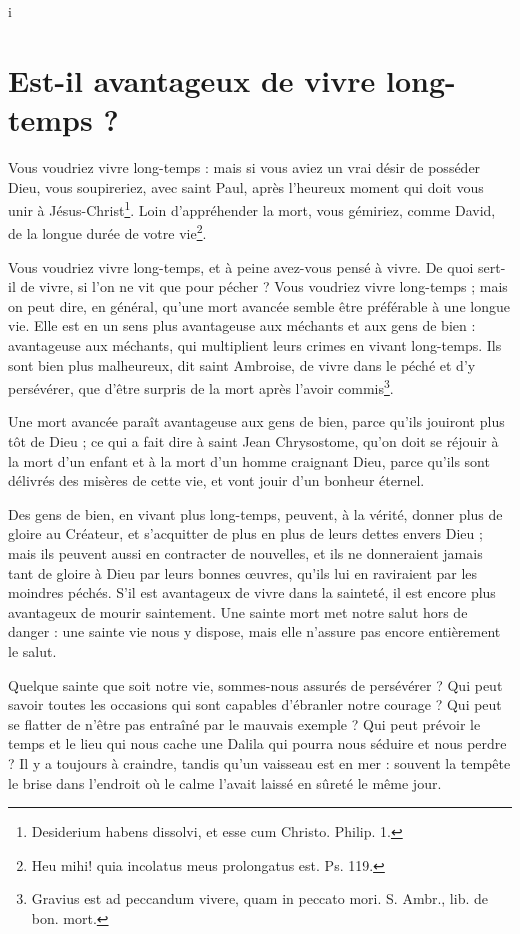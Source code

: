i\documentclass[instructions.tex]{subfiles}
\begin{document}
\chapter{Est-il avantageux de vivre long-temps ?}

\primo Vous voudriez vivre long-temps : mais si vous aviez un vrai désir de posséder Dieu, vous soupireriez, avec saint Paul, après l'heureux moment qui doit vous unir à Jésus-Christ\footnote{Desiderium habens dissolvi, et esse cum Christo. Philip. 1.}. Loin d'appréhender la mort, vous gémiriez, comme David, de la longue durée de votre vie\footnote{Heu mihi! quia incolatus meus prolongatus est. Ps. 119.}.

Vous voudriez vivre long-temps, et à peine avez-vous pensé à vivre. De quoi sert-il de vivre, si l'on ne vit que pour pécher ? Vous voudriez vivre long-temps ; mais on peut dire, en général, qu'une mort avancée semble être préférable à une longue vie. Elle est en un sens plus avantageuse aux méchants et aux gens de bien : avantageuse aux méchants, qui multiplient leurs crimes en vivant long-temps. Ils sont bien plus malheureux, dit saint Ambroise, de vivre dans le péché et d'y persévérer, que d'être surpris de la mort après l'avoir commis\footnote{Gravius est ad peccandum vivere, quam in peccato mori. S. Ambr., lib. de bon. mort.}.

\secundo Une mort avancée paraît avantageuse aux gens de bien, parce qu'ils jouiront plus tôt de Dieu ; ce qui a fait dire à saint Jean Chrysostome, qu'on doit se réjouir à la mort d'un enfant et à la mort d'un homme craignant Dieu, parce qu'ils sont délivrés des misères de cette vie, et vont jouir d'un bonheur éternel.

Des gens de bien, en vivant plus long-temps, peuvent, à la vérité, donner plus de gloire au Créateur, et s'acquitter de plus en plus de leurs dettes envers Dieu ; mais ils peuvent aussi en contracter de nouvelles, et ils ne donneraient jamais tant de gloire à Dieu par leurs bonnes œuvres, qu'ils lui en raviraient par les moindres péchés. S'il est avantageux de vivre dans la sainteté, il est encore plus avantageux de mourir saintement. Une sainte mort met notre salut hors de danger : une sainte vie nous y dispose, mais elle n'assure pas encore entièrement le salut.

Quelque sainte que soit notre vie, sommes-nous assurés de persévérer ? Qui peut savoir toutes les occasions qui sont capables d'ébranler notre courage ? Qui peut se flatter de n'être pas entraîné par le mauvais exemple ? Qui peut prévoir le temps et le lieu qui nous cache une Dalila qui pourra nous séduire et nous perdre ? Il y a toujours à craindre, tandis qu'un vaisseau est en mer : souvent la tempête le brise dans l'endroit où le calme l'avait laissé en sûreté le même jour.
\end{document}
